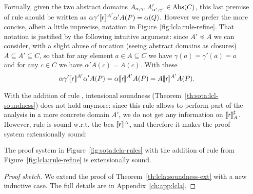 Formally, given the two abstract domains $A_{\alpha, \gamma}, A'_{\alpha', \gamma'} \in \text{\normalfont Abs}(C)$, this last premise of rule  should be written as $\alpha \gamma' \llbracket\mathsf{r}\rrbracket^{A'} \alpha' A(P) = \alpha(Q)$. However we prefer the more concise, albeit a little imprecise, notation in Figure~\ref{fig:lcla:rule-refine}. That notation is justified by the following intuitive argument: since $A' \preceq A$ we can consider, with a slight abuse of notation (seeing abstract domains as closures) $A \subseteq A' \subseteq C$, so that for any element $a \in A \subseteq C$ we have $\gamma(a) = \gamma'(a) = a$ and for any $c \in C$ we have $\alpha' A(c) = A(c)$. With these
\[
\alpha \gamma' \llbracket\mathsf{r}\rrbracket^{A'} \alpha' A(P) = \alpha \llbracket\mathsf{r}\rrbracket^{A'} A(P) = A \llbracket\mathsf{r}\rrbracket^{A'} A(P) .
\]

With the addition of rule , intensional soundness (Theorem~\ref{th:sota:lcl-soundness}) does not hold anymore: since this rule allows to perform part of the analysis in a more concrete domain $A'$, we do not get any information on $\llbracket\mathsf{r}\rrbracket^{\sharp}_A$. However, rule  is sound w.r.t. the bca $\llbracket\mathsf{r}\rrbracket^A$, and therefore it makes the proof system extensionally sound:

\begin{theorem}\label{th:lcla:soundness-rule-refine}
	The proof system in Figure~\ref{fig:sota:lcla-rules} with the addition of rule  from Figure~\ref{fig:lcla:rule-refine} is extensionally sound.
\end{theorem}
\begin{proof}[Proof sketch]
	We extend the proof of Theorem~\ref{th:lcla:soundness-ext} with a new inductive case. The full details are in Appendix~\ref{ch:app:lcla}.
\end{proof}

